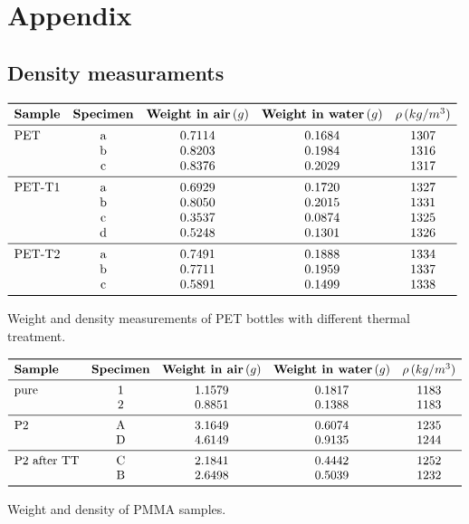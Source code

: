 \documentclass[a4paper, 11pt]{article}
\begin{document}
\newpage

\section{Appendix}

\subsection{Density measuraments}

\begin{table}[htp]
\centering
$
\begin{array}{lcccc}
\toprule
\textbf{Sample} & \textbf{Specimen} & \textbf{Weight in air}\,(g) & \textbf{Weight in water}\,(g) & \mathbf{\rho}\,(kg/m^{3})\\
\midrule
\text{PET} & \text{a} & 0.7114 & 0.1684 & 1307\\
& \text{b} & 0.8203 & 0.1984 & 1316\\
& \text{c} & 0.8376 & 0.2029 & 1317\\
\midrule
\text{PET-T1} & \text{a} & 0.6929 & 0.1720 &  1327\\
& \text{b} & 0.8050 & 0.2015 & 1331\\
& \text{c} & 0.3537 & 0.0874 & 1325\\
& \text{d} & 0.5248 & 0.1301 & 1326\\
\midrule
\text{PET-T2} & \text{a} & 0.7491 & 0.1888 & 1334\\
& \text{b} & 0.7711 & 0.1959 & 1337\\
& \text{c} & 0.5891 & 0.1499 & 1338\\
\bottomrule
\end{array}
$
\caption{Weight and density measurements of PET bottles with different thermal treatment.}
\label{tab:admt}
\end{table}

\begin{table}[htp]
\centering
$
\begin{array}{lcccc}
\toprule
\textbf{Sample} & \textbf{Specimen} & \textbf{Weight in air}\,(g) & \textbf{Weight in water}\,(g) &  \mathbf{\rho}\,(kg/m^{3})\\
\midrule
\text{pure} & 1 & 1.1579 & 0.1817 & 1183\\
& 2 & 0.8851 & 0.1388 & 1183\\
\midrule
\text{P2} & \text{A} & 3.1649 & 0.6074 & 1235\\
& \text{D} & 4.6149 & 0.9135 & 1244\\
\midrule
\text{P2 after TT} & \text{C} & 2.1841 & 0.4442 & 1252\\
& \text{B} & 2.6498 & 0.5039 & 1232\\
\bottomrule
\end{array}
$
\caption{Weight and density of PMMA samples.}
\label{tab:apmma}
\end{table}
\end{document}
